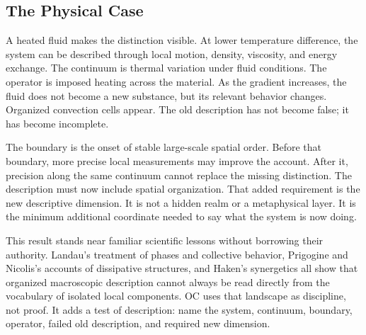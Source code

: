 \documentclass[11pt,a4paper,openany]{book}
\begin{document}
\subsection{The Physical Case}
A heated fluid makes the distinction visible. At lower temperature difference, the system can be described through local motion, density, viscosity, and energy exchange. The continuum is thermal variation under fluid conditions. The operator is imposed heating across the material. As the gradient increases, the fluid does not become a new substance, but its relevant behavior changes. Organized convection cells appear. The old description has not become false; it has become incomplete. \cite{landau_stat_physics,prigogine_dissipative}\par
The boundary is the onset of stable large-scale spatial order. Before that boundary, more precise local measurements may improve the account. After it, precision along the same continuum cannot replace the missing distinction. The description must now include spatial organization. That added requirement is the new descriptive dimension. It is not a hidden realm or a metaphysical layer. It is the minimum additional coordinate needed to say what the system is now doing.\par
This result stands near familiar scientific lessons without borrowing their authority. Landau's treatment of phases and collective behavior, Prigogine and Nicolis's accounts of dissipative structures, and Haken's synergetics all show that organized macroscopic description cannot always be read directly from the vocabulary of isolated local components. OC uses that landscape as discipline, not proof. It adds a test of description: name the system, continuum, boundary, operator, failed old description, and required new dimension.\par
\end{document}
